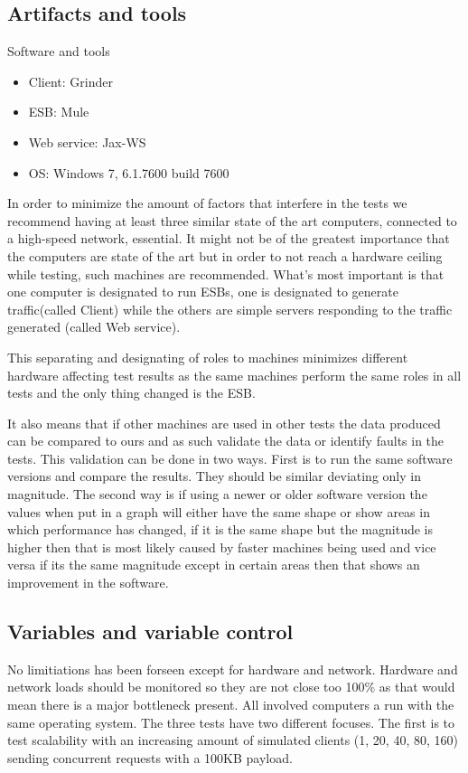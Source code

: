 \subsection{Artifacts and tools}
\begin{table}[H]
	\caption{Software and tools}
	\begin{itemize}
		\item Client: Grinder \cite{whatisgrinder}
		\item ESB: Mule \cite{whatismule}
		\item Web service: Jax-WS \cite{whatisjaxws}
		\item OS: Windows 7, 6.1.7600 build 7600
	\end{itemize}
\end{table}
In order to minimize the amount of factors that interfere in the tests we recommend having at least three similar state of the art computers, connected to a high-speed network, essential.
It might not be of the greatest importance that the computers are state of the art but in order to not reach a hardware ceiling while testing, such machines are recommended. 
What's most important is that one computer is designated to run ESBs, one is designated to generate traffic(called Client) while the others are simple servers responding to the traffic generated (called Web service). 

This separating and designating of roles to machines minimizes different hardware affecting test results as the same machines perform the same roles in all tests and the only thing changed is the ESB. 

It also means that if other machines are used in other tests the data produced can be compared to ours and as such validate the data or identify faults in the tests. 
This validation can be done in two ways. 
First is to run the same software versions and compare the results. 
They should be similar deviating only in magnitude. The second way is if using a newer or older software version the values when put in a graph will either have the same shape or show areas in which performance has changed, 
if it is the same shape but the magnitude is higher then that is most likely caused by faster machines being used and vice versa if its the same magnitude except in certain areas then that shows an improvement in the software.

\subsection{Variables and variable control}
No limitiations has been forseen except for hardware and network.
Hardware and network loads should be monitored so they are not close too 100\% as that would mean there is a major bottleneck present. 
All involved computers a run with the same operating system.
The three tests have two different focuses. The first is to test scalability with an increasing amount of simulated clients (1, 20, 40, 80, 160) sending concurrent requests with a 100KB payload. 
